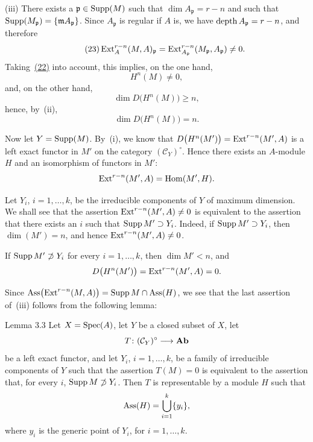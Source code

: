 \medskip
\noindent\textup{(iii)} There exists a
$\mathfrak p\in\operatorname{Supp}(M)$ such that $\dim A_{\mathfrak p}=r-n$ and such that
$\operatorname{Supp}(M_{\mathfrak p})=\{\mathfrak m A_{\mathfrak p}\}$. Since
$A_{\mathfrak p}$ is regular if $A$ is, we have
$\operatorname{depth} A_{\mathfrak p}=r-n$, and therefore
\begin{equation}\tag{23}\label{eq:V.23}
  \operatorname{Ext}_A^{r-n}(M,A)_{\mathfrak p}
  =\operatorname{Ext}_{A_{\mathfrak p}}^{r-n}(M_{\mathfrak p},A_{\mathfrak p})\neq 0.
\end{equation}
Taking~\textup{\hyperref[eq:V.22]{(22)}} into account, this implies, on the one hand,
\[
  H^n(M)\neq 0,
\]
and, on the other hand,
\[
  \dim D\bigl(H^n(M)\bigr)\geq n,
\]
hence, by~\textup{(ii)},
\[
  \dim D\bigl(H^n(M)\bigr)=n.
\]

\medskip
Now let $Y=\operatorname{Supp}(M)$. By~\textup{(i)}, we know that
$D\bigl(H^n(M')\bigr)=\operatorname{Ext}^{r-n}(M',A)$ is a left exact functor in $M'$ on
the category $(\mathcal C_Y)^\circ$. Hence there exists an $A$-module $H$ and
an isomorphism of functors in $M'$:
\[
  \operatorname{Ext}^{r-n}(M',A)=\operatorname{Hom}(M',H).
\]

Let $Y_i$, $i=1,\ldots,k$, be the irreducible components of $Y$ of maximum
dimension. We shall see that the assertion
$\operatorname{Ext}^{r-n}(M',A)\neq 0$ is equivalent to the assertion that there exists an
$i$ such that $\operatorname{Supp} M'\supset Y_i$. Indeed, if
$\operatorname{Supp} M'\supset Y_i$, then $\dim(M')=n$, and hence
$\operatorname{Ext}^{r-n}(M',A)\neq 0$.

If $\operatorname{Supp} M'\not\supset Y_i$ for every $i=1,\ldots,k$, then
$\dim M'<n$, and
\[
  D\bigl(H^n(M')\bigr)=\operatorname{Ext}^{r-n}(M',A)=0.
\]

Since
$\operatorname{Ass}\bigl(\operatorname{Ext}^{r-n}(M,A)\bigr)=\operatorname{Supp} M\cap\operatorname{Ass}(H)$, we see that
the last assertion of~\textup{(iii)} follows from the following lemma:

\begin{sgalemma}{Lemma 3.3}
Let $X=\operatorname{Spec}(A)$, let $Y$ be a closed subset of $X$, let
\[
  T\colon(\mathcal C_Y)^\circ\longrightarrow\mathbf{Ab}
\]
be a left exact functor, and let $Y_i$, $i=1,\ldots,k$, be a family of
irreducible components of $Y$ such that the assertion $T(M)=0$ is equivalent
to the assertion that, for every $i$, $\operatorname{Supp} M\not\supset Y_i$. Then $T$ is
representable by a module $H$ such that
\[
  \operatorname{Ass}(H)=\bigcup_{i=1}^k\{y_i\},
\]
where $y_i$ is the generic point of $Y_i$, for $i=1,\ldots,k$.
\end{sgalemma}

